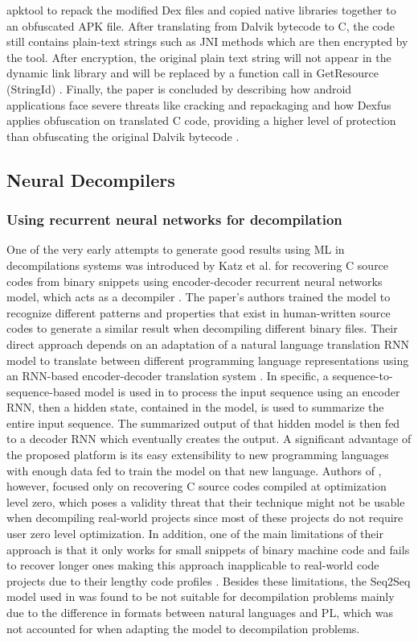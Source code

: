 \documentclass[conference,a4paper]{IEEEtran}
\begin{document}
apktool to repack the modified Dex files and copied native libraries together to an obfuscated APK file. After translating from Dalvik bytecode to C, the code still contains plain-text strings such as JNI methods which are then encrypted by the tool. After encryption, the original plain text string will not appear in the dynamic link library and will be replaced by a function call in GetResource (StringId) \cite{naitian_dexfus_2020}.
Finally, the paper is concluded by describing how android applications face severe threats like cracking and repackaging and how Dexfus applies obfuscation on translated C code, providing a higher level of protection than obfuscating the original Dalvik bytecode \cite{naitian_dexfus_2020}.

\subsection{Neural Decompilers}

\subsubsection{Using recurrent neural networks for decompilation}
One of the very early attempts to generate good results using ML in decompilations systems was introduced by Katz et al. for recovering C source codes from binary snippets using encoder-decoder recurrent neural networks model, which acts as a decompiler \cite{katz_using_2018}.
The paper's authors trained the model to recognize different patterns and properties that exist in human-written source codes to generate a similar result when decompiling different binary files.
Their direct approach depends on an adaptation of a natural language translation RNN model to translate between different programming language representations using an RNN-based encoder-decoder translation system \cite{katz_using_2018}.
In specific, a sequence-to-sequence-based model is used in \cite{katz_using_2018} to process the input sequence using an encoder RNN, then a hidden state, contained in the model, is used to summarize the entire input sequence.
The summarized output of that hidden model is then fed to a decoder RNN which eventually creates the output. 
A significant advantage of the proposed platform is its easy extensibility to new programming languages with enough data fed to train the model on that new language.
Authors of \cite{katz_using_2018}, however, focused only on recovering C source codes compiled at optimization level zero, which poses a validity threat that their technique might not be usable when decompiling real-world projects since most of these projects do not require user zero level optimization.
In addition, one of the main limitations of their approach is that it only works for small snippets of binary machine code and fails to recover longer ones making this approach inapplicable to real-world code projects due to their lengthy code profiles \cite{katz_using_2018}.
Besides these limitations, the Seq2Seq model used in \cite{katz_using_2018} was found to be not suitable for decompilation problems mainly due to the difference in formats between natural languages and PL, which was not accounted for when adapting the model to decompilation problems.
\end{document}
